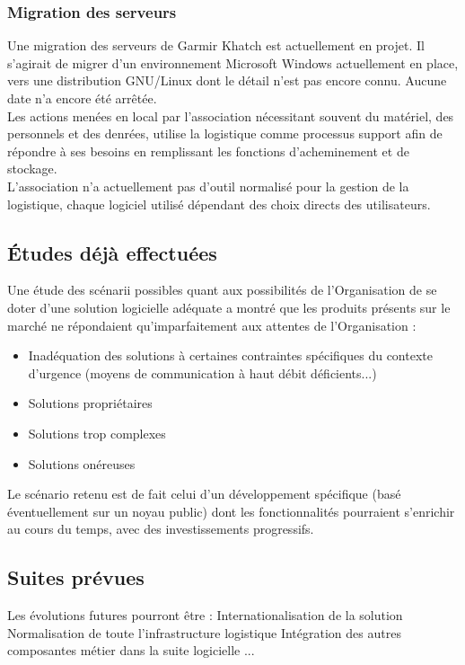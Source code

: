 \subsubsection{Migration des serveurs}
Une migration des serveurs de Garmir Khatch est actuellement en projet. Il s'agirait de migrer d'un environnement Microsoft Windows actuellement en place, vers une distribution GNU/Linux dont le détail n'est pas encore connu. Aucune date n'a encore été arrêtée.
\\
Les actions menées en local par l'association nécessitant souvent du matériel, des personnels et des denrées,  utilise la logistique comme processus support afin de répondre à ses besoins en remplissant les fonctions d'acheminement et de stockage.
\\
L'association n'a actuellement pas d'outil normalisé pour la gestion de la logistique, chaque logiciel utilisé dépendant des choix directs des utilisateurs.

\subsection{Études déjà effectuées}
Une étude des scénarii possibles quant aux possibilités de l'Organisation de se doter d'une solution logicielle adéquate a montré que les produits présents sur le marché ne répondaient qu'imparfaitement aux attentes de l'Organisation :
\begin{itemize}
\item Inadéquation des solutions à certaines contraintes spécifiques du contexte d'urgence (moyens de communication à haut débit déficients...)
\item Solutions propriétaires
\item Solutions trop complexes
\item Solutions onéreuses
\end{itemize}
Le scénario retenu est de fait celui d'un développement spécifique (basé éventuellement sur un noyau public) dont les fonctionnalités pourraient s'enrichir au cours du temps, avec des investissements progressifs.

\subsection{Suites prévues}
Les évolutions futures pourront être :
Internationalisation de la solution
Normalisation de toute l'infrastructure logistique
Intégration des autres composantes métier dans la suite logicielle
...

